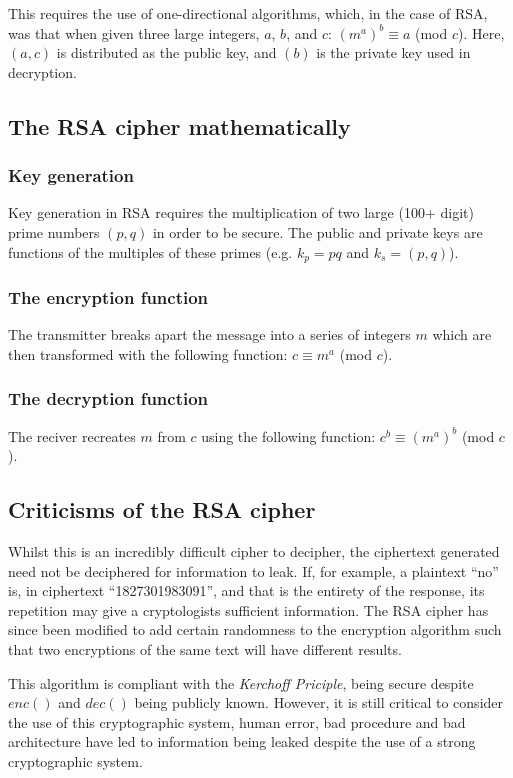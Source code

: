 \documentclass{AIAA}
\begin{document}
This requires the use of one-directional algorithms, which, in the case of RSA, was that when given three large integers, $a$, $b$, and $c$: $(m^{a})^{b} \equiv a $ (mod $c$). Here, $(a,c)$ is distributed as the public key, and $(b)$ is the private key used in decryption.

\subsection{The RSA cipher mathematically}
\subsubsection{Key generation}
Key generation in RSA requires the multiplication of two large (100+ digit) prime numbers $(p,q)$ in order to be secure. The public and private keys are functions of the multiples of these primes (e.g. $k_{p}=pq$ and $k_s=(p,q)$).
\subsubsection{The encryption function}
The transmitter breaks apart the message into a series of integers $m$ which are then transformed with the following function:
$c \equiv m^{a} $ (mod $c$).
\subsubsection{The decryption function}
The reciver recreates $m$ from $c$ using the following function:
$c^{b} \equiv (m^{a})^{b} $ (mod $c$). 

\subsection{Criticisms of the RSA cipher}
Whilst this is an incredibly difficult cipher to decipher, the ciphertext generated need not be deciphered for information to leak. If, for example, a plaintext ``no'' is, in ciphertext ``1827301983091'', and that is the entirety of the response, its repetition may give a cryptologists sufficient information. The RSA cipher has since been modified to add certain randomness to the encryption algorithm such that two encryptions of the same text will have different results.

This algorithm is compliant with the \textit{Kerchoff Priciple}, being secure despite $enc()$ and $dec()$ being publicly known. However, it is still critical to consider the use of this cryptographic system, human error, bad procedure and bad architecture have led to information being leaked despite the use of a strong cryptographic system.
\end{document}
